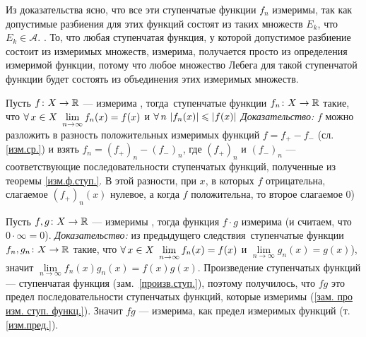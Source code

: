 \begin{zam}\label{зам. про изм. ступ. функц.}
	Из доказательства ясно, что все эти ступенчатые функции $f_n$ измеримы, так как допустимые разбиения для этих функций состоят из таких множеств $E_k$, что $E_k \in \mathcal A$. . То, что любая ступенчатая функция, у которой допустимое разбиение состоит из измеримых множеств, измерима, получается просто из определения измеримой функции, потому что любое множество Лебега для такой ступенчатой функции будет состоять из объединения этих измеримых множеств.
\end{zam}

\begin{slv}[https://www.youtube.com/live/D_Nn53jVQxE?si=BWWH7fyNDeDPB5yH&t=11690]
	Пусть $f \colon X \to \mathbb R$ --- измерима , тогда\E\ ступенчатые функции $f_n \colon X \to \mathbb R$ такие, что $\forall \, x \in X\ \lim\limits_{n \to \infty} f_n(x) = f(x)$ и $\forall \, n\ |f_n(x)| \leqslant |f(x)|$ \textit{Доказательство:} $f$ можно разложить в разность положительных измеримых функций $f = f_+ - f_-$ (сл. \ref{изм.ср.}) и взять $f_n = (f_+)_n - (f_-)_n$, где $(f_+)_n$ и $(f_-)_n$ --- соответствующие последовательности ступенчатых функций, полученные из теоремы  \ref{изм.ф.ступ.}. В этой разности, при $x$, в которых $f$ отрицательна, слагаемое $(f_+)_n(x)$ нулевое, а когда $f$ положительна, то второе слагаемое 0)
\end{slv}

\begin{slv}[https://www.youtube.com/live/3LvgYceATKY?si=f2_NDoyMYDquQWRc&t=7926]
	Пусть $f, g \colon X \to \mathbb R$ --- измеримы , тогда функция $f \cdot g$ измерима (и считаем, что $0 \cdot \infty = 0$). \textit{Доказательство:} из предыдущего следствия\E\ ступенчатые функции $f_n, g_n \colon X \to \mathbb R$ такие, что $\forall \, x \in X\ \lim\limits_{n \to \infty}f_n(x) = f(x)$ и $\lim\limits_{n \to \infty}g_n(x) = g(x)$), значит $\lim\limits_{n \to \infty}f_n(x)g_n(x) = f(x)g(x)$. Произведение ступенчатых функций --- ступенчатая функция (зам.~\ref{произв.ступ.}), поэтому получилось, что $fg$ это предел последовательности ступенчатых функций, которые измеримы (\ref{зам. про изм. ступ. функц.}). Значит $fg$ --- измерима, как предел измеримых функций (т. \ref{изм.пред.}).
\end{slv}

